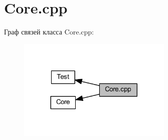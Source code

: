 \hypertarget{group__corecpp}{}\section{Core.\+cpp}
\label{group__corecpp}
Граф связей класса Core.\+cpp\+:
\nopagebreak
\begin{figure}[H]
\begin{center}
\leavevmode
\includegraphics[width=209pt]{group__corecpp}
\end{center}
\end{figure}
